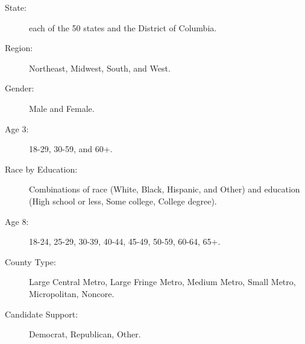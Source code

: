 \documentclass[12pt]{article}
\begin{document}
\begin{description}
\item [State:] each of the 50 states and the District of Columbia.
\item [Region:] Northeast, Midwest, South, and West.
\item [Gender:] Male and Female.
\item [Age 3:] 18-29, 30-59, and 60+.
\item [Race by Education:] Combinations of race (White, Black, Hispanic, and Other) and education (High school or less, Some college, College degree).
\item [Age 8:] 18-24, 25-29, 30-39, 40-44, 45-49, 50-59, 60-64, 65+.
\item [County Type:] Large Central Metro, Large Fringe Metro, Medium Metro, Small Metro, Micropolitan, Noncore.
\item [Candidate Support:] Democrat, Republican, Other.
\end{description}
\end{document}
